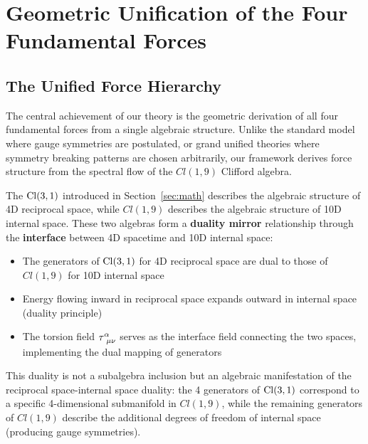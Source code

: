 \section{Geometric Unification of the Four Fundamental Forces}
\label{sec:four_forces_unified}

\subsection{The Unified Force Hierarchy}

The central achievement of our theory is the geometric derivation of all four fundamental forces from a single algebraic structure. Unlike the standard model where gauge symmetries are postulated, or grand unified theories where symmetry breaking patterns are chosen arbitrarily, our framework derives force structure from the spectral flow of the $Cl(1,9)$ Clifford algebra.

\begin{insight}
The $\mathrm{Cl}(3,1)$ introduced in Section~\ref{sec:math} describes the algebraic structure of 4D reciprocal space, while $Cl(1,9)$ describes the algebraic structure of 10D internal space. These two algebras form a \textbf{duality mirror} relationship through the \textbf{interface} between 4D spacetime and 10D internal space:
\begin{itemize}
    \item The generators of $\mathrm{Cl}(3,1)$ for 4D reciprocal space are dual to those of $Cl(1,9)$ for 10D internal space
    \item Energy flowing inward in reciprocal space expands outward in internal space (duality principle)
    \item The torsion field $\torsion^\alpha_{\ \mu\nu}$ serves as the interface field connecting the two spaces, implementing the dual mapping of generators
\end{itemize}
This duality is not a subalgebra inclusion but an algebraic manifestation of the reciprocal space-internal space duality: the 4 generators of $\mathrm{Cl}(3,1)$ correspond to a specific 4-dimensional submanifold in $Cl(1,9)$, while the remaining generators of $Cl(1,9)$ describe the additional degrees of freedom of internal space (producing gauge symmetries).
\end{insight}


